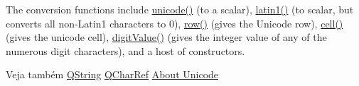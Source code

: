 The conversion functions include \hyperlink{class_q_char_adbb6411982cdf1d5213ca84058629fe3}{unicode()} (to a scalar), \hyperlink{class_q_char_aef586395e322881ad34f67ee323b524d}{latin1()} (to scalar, but converts all non-\/\-Latin1 characters to 0), \hyperlink{class_q_char_aa0362ae052f9a76a268e0d23859a62f5}{row()} (gives the Unicode row), \hyperlink{class_q_char_a394d84a6409ef552513d7e486cfaef0a}{cell()} (gives the unicode cell), \hyperlink{class_q_char_aa9f0b380bc69d7b7ed21313c9c2cdd8c}{digit\-Value()} (gives the integer value of any of the numerous digit characters), and a host of constructors.

\begin{DoxySeeAlso}{Veja também}
\hyperlink{class_q_string}{Q\-String} \hyperlink{class_q_char_ref}{Q\-Char\-Ref} \hyperlink{class_q_char_adbb6411982cdf1d5213ca84058629fe3}{About Unicode } 
\end{DoxySeeAlso}


